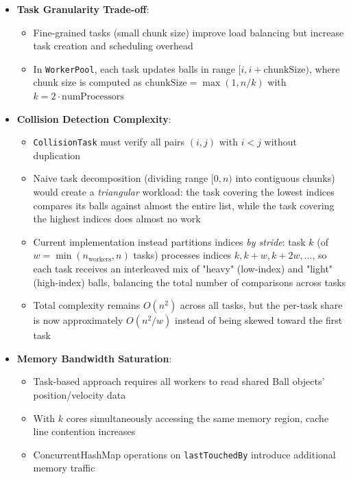 \documentclass[12pt,a4paper]{article}
\begin{document}
\begin{itemize}
    \item \textbf{Task Granularity Trade-off}: 
    \begin{itemize}
        \item Fine-grained tasks (small chunk size) improve load balancing but increase task creation and scheduling overhead
        \item In \texttt{WorkerPool}, each task updates balls in range $[i, i+\text{chunkSize})$, where chunk size is computed as $\text{chunkSize} = \max(1, n/k)$ with $k = 2 \cdot \text{numProcessors}$
    \end{itemize}
    
    \item \textbf{Collision Detection Complexity}:
    \begin{itemize}
        \item \texttt{CollisionTask} must verify all pairs $(i,j)$ with $i < j$ without duplication
        \item Naive task decomposition (dividing range $[0, n)$ into contiguous chunks) would create a \textit{triangular} workload: the task covering the lowest indices compares its balls against almost the entire list, while the task covering the highest indices does almost no work
        \item Current implementation instead partitions indices \textit{by stride}: task $k$ (of $w = \min(n_{\text{workers}}, n)$ tasks) processes indices $k, k+w, k+2w, \dots$, so each task receives an interleaved mix of "heavy" (low-index) and "light" (high-index) balls, balancing the total number of comparisons across tasks
        \item Total complexity remains $O(n^2)$ across all tasks, but the per-task share is now approximately $O(n^2/w)$ instead of being skewed toward the first task
    \end{itemize}
    
    \item \textbf{Memory Bandwidth Saturation}:
    \begin{itemize}
        \item Task-based approach requires all workers to read shared Ball objects' position/velocity data
        \item With $k$ cores simultaneously accessing the same memory region, cache line contention increases
        \item ConcurrentHashMap operations on \texttt{lastTouchedBy} introduce additional memory traffic
    \end{itemize}
    

\end{itemize}
\end{document}
